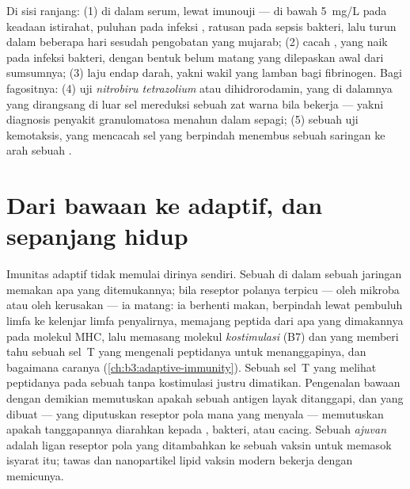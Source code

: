 \begin{method}\label{met:b3:innate-immunity:tests}
Di sisi ranjang: (1) \emph{} di dalam serum, lewat
imunouji --- di bawah \qty{5}{mg/L} pada keadaan istirahat, puluhan pada
infeksi , ratusan pada sepsis bakteri, lalu turun dalam beberapa hari
sesudah pengobatan yang mujarab; (2) cacah , yang naik pada infeksi
bakteri, dengan bentuk belum matang yang dilepaskan awal dari sumsumnya; (3)
laju endap darah, yakni wakil yang lamban bagi fibrinogen. Bagi
fagositnya: (4) uji \emph{nitrobiru tetrazolium} atau dihidrorodamin,
yang di dalamnya  yang dirangsang di luar sel mereduksi sebuah zat warna bila
 bekerja --- yakni diagnosis penyakit granulomatosa menahun
dalam sepagi; (5) sebuah uji kemotaksis, yang mencacah sel yang berpindah
menembus sebuah saringan ke arah sebuah .
\end{method}

\section{Dari bawaan ke adaptif, dan sepanjang hidup}

\begin{proposition}\label{prop:b3:innate-immunity:bridge}
Imunitas adaptif tidak memulai dirinya sendiri. Sebuah \emph{} di
dalam sebuah jaringan memakan apa yang ditemukannya; bila reseptor polanya
terpicu --- oleh mikroba atau oleh kerusakan --- ia matang: ia berhenti makan,
berpindah lewat pembuluh limfa ke kelenjar limfa penyalirnya, memajang
peptida dari apa yang dimakannya pada molekul MHC, lalu memasang
molekul \emph{kostimulasi} (B7) dan  yang memberi tahu sebuah sel~T
yang mengenali peptidanya untuk menanggapinya, dan bagaimana caranya
(\cref{ch:b3:adaptive-immunity}). Sebuah sel~T yang melihat peptidanya pada
sebuah  tanpa kostimulasi justru dimatikan. Pengenalan bawaan
dengan demikian memutuskan apakah sebuah antigen layak ditanggapi, dan 
yang dibuat  --- yang diputuskan reseptor pola mana yang
menyala --- memutuskan apakah tanggapannya diarahkan kepada , bakteri, atau
cacing. Sebuah \emph{ajuvan} adalah ligan reseptor pola yang ditambahkan ke
sebuah vaksin untuk memasok isyarat itu; tawas dan nanopartikel lipid vaksin
modern bekerja dengan memicunya.
\end{proposition}

